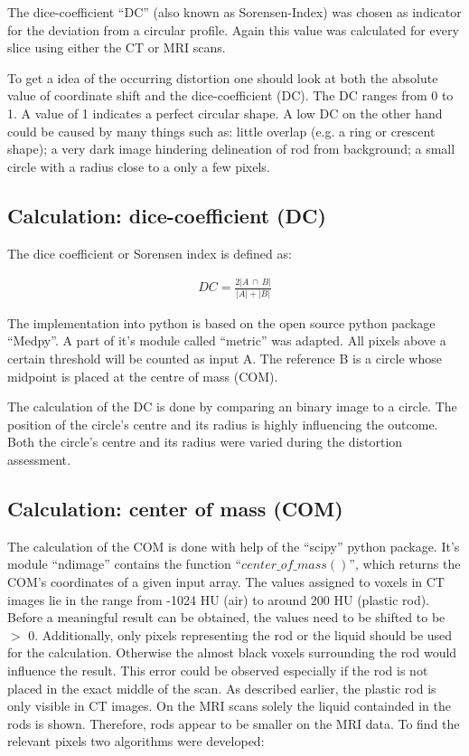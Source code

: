 
The dice-coefficient ``DC'' (also known as Sorensen-Index) was chosen as indicator for the deviation from a circular profile. Again this value was calculated for every slice using either the CT or MRI scans.

To get a idea of the occurring distortion one should look at both the absolute value of coordinate shift and the dice-coefficient (DC).
The DC ranges from 0 to 1. A value of 1 indicates a perfect circular shape. A low DC on the other hand could be caused by many things such as:
little overlap (e.g. a ring or crescent shape); a very dark image hindering delineation of rod from background; a small circle with a radius close to a only a few pixels.



\subsection{Calculation: dice-coefficient (DC)}

The dice coefficient or Sorensen index \cite{MedPy_dc-doc} is defined as:

\begin{align}
DC = \frac{2 |A \, \cap \, B|}{|A| + |B|}
\end{align}

The implementation into python is based on the open source python package ``Medpy''. \cite{MedPy} A part of it's module called ``metric'' was adapted. \cite{MedPy_dc-code}
All pixels above a certain threshold will be counted as input A. The reference B is a circle whose midpoint is placed at the centre of mass (COM).

The calculation of the DC is done by comparing an binary image to a circle. The position of the circle's centre and its radius is highly influencing the outcome.
Both the circle's centre and its radius were varied during the distortion assessment.


\subsection{Calculation: center of mass (COM)}

The calculation of the COM is done with help of the ``scipy'' python package.
It's module ``ndimage'' contains the function ``$center\_of\_mass()$'', which returns the COM's coordinates of a given input array.
The values assigned to voxels in CT images lie in the range from -1024 HU (air) to around 200 HU (plastic rod).
Before a meaningful result can be obtained, the values need to be shifted to be $>$ 0.
Additionally, only pixels representing the rod or the liquid should be used for the calculation.
Otherwise the almost black voxels surrounding the rod would influence the result.
This error could be observed especially if the rod is not placed in the exact middle of the scan.
As described earlier, the plastic rod is only visible in CT images. On the MRI scans solely the liquid containded in the rods is shown.
Therefore, rods appear to be smaller on the MRI data.
To find the relevant pixels two algorithms were developed:


